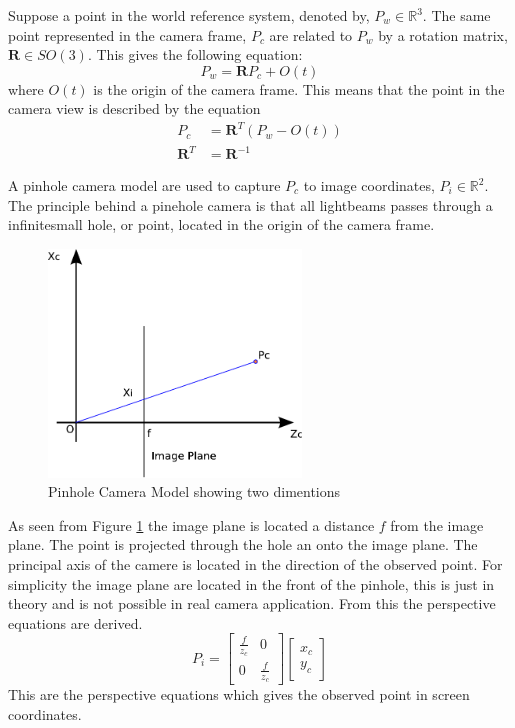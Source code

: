 	Suppose a point in the world reference system, denoted by, $P_w \in \mathbb{R}^3$. The same point
	represented in the camera frame, $P_c$ are related to $P_w$ by a rotation matrix, $\mathbf{R} \in
	SO(3)$. This gives the following equation: 
	\begin{equation}
		P_w = \mathbf{R} P_c + O(t)
	\end{equation}
	where $O(t)$ is the origin of the camera frame. This means that the point in the camera view is
	described by the equation
	\begin{equation}
		\label{eq:ch1-P_c}
		\begin{aligned}
			P_c &= \mathbf{R}^T (P_w - O(t)) \\
			\mathbf{R}^T &= \mathbf{R}^{-1} 
		\end{aligned}
	\end{equation}

	A pinhole camera model are used to capture $P_c$ to image coordinates, $P_i \in
	\mathbb{R}^2$. 
	The principle behind a pinehole camera is that all lightbeams passes through a
	infinitesmall hole, or point, located in the origin of the camera frame.   
	\begin{figure}[hbtp]
		\centering
		\includegraphics[width=0.6\textwidth]{pics/pinhole_model}
		\caption{Pinhole Camera Model showing two dimentions}
		\label{fig:ch1-pinhole}
	\end{figure}
			
	As seen from Figure \ref{fig:ch1-pinhole} the image plane is located a distance $f$ from the image plane. 
	The point is projected through the hole an onto the image plane. The principal axis of the camere is located
	in the direction of the observed point. For simplicity the image plane are located in the front of the
	pinhole, this is just in theory and is not possible in real camera application. From this the
	perspective equations are derived. \cite{robotbok}
	\begin{equation}
		\label{eq:ch1-perspective}
		P_i = \left[ \begin{array}{cc}
					\frac{f}{z_c} & 0 \\
					0	& \frac{f}{z_c} 
				\end{array} \right] 
				\left[ \begin{array}{c}
					x_c \\
					y_c
					\end{array} \right]
	\end{equation}
	This are the perspective equations which gives the observed point in screen coordinates. 

